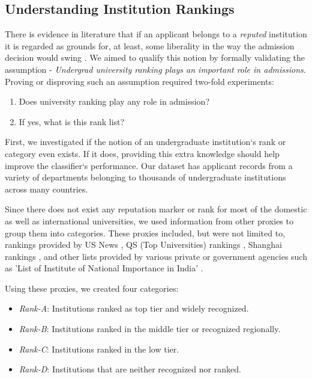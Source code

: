\documentclass{sig-alternate-05-2015}
\begin{document}
\subsection{Understanding Institution Rankings}
\label{subsec:ranking-exp}
There is evidence in literature that if an applicant belongs to a \textit{reputed} institution it  is regarded as grounds for, at least, some liberality in the way the admission decision would swing \cite{dagap}. We aimed to qualify this notion by formally validating the assumption - \textit{Undergrad university ranking plays an important role in admissions}. Proving or disproving such an assumption required two-fold experiments:\\
\begin{enumerate}
\item Does university ranking play any role in admission?
\item If yes, what is this rank list?
\end{enumerate}

First, we investigated if the notion of an undergraduate institution`s rank or category even exists. If it does, providing this extra knowledge should help improve the classifier`s performance. Our dataset has applicant records from a variety of departments belonging to thousands of undergraduate institutions across many countries. 

Since there does not exist any reputation marker or rank for most of the domestic as well as international universities, we used information from other proxies to group them into categories. These proxies included, but were not limited to, rankings provided by US News \cite{usnews}, QS (Top Universities) rankings \cite{qs}, Shanghai rankings \cite{shanghai}, and other lists provided by various private or government agencies such as 'List of Institute of National Importance in India' \cite{national-importance}.

Using these proxies, we created four categories:
\begin{itemize}
\item \textit{Rank-A}: Institutions ranked as top tier and widely recognized.
\item \textit{Rank-B}: Institutions ranked in the middle tier or recognized regionally.
\item \textit{Rank-C}: Institutions ranked in the low tier.
\item \textit{Rank-D}: Institutions that are neither recognized nor ranked.
\end{itemize}
\end{document}
